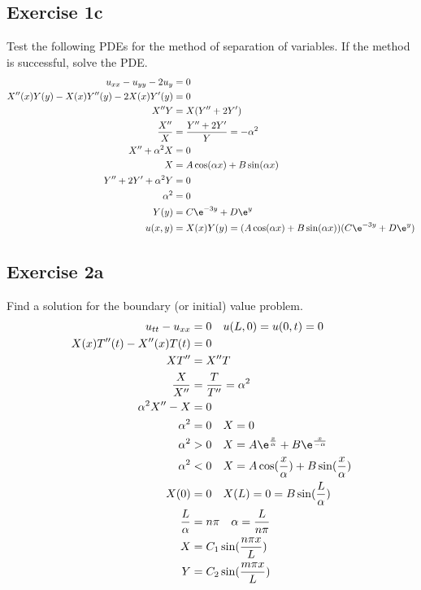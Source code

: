 \documentclass{math}
\begin{document}
\subsection*{Exercise 1c}
Test the following PDEs for the method of separation of variables. If the
method is successful, solve the PDE.
\begin{align*}
  u_{xx}-u_{yy}-2u_y &= 0 \\
  X''(x)Y(y)-X(x)Y''(y)-2X(x)Y'(y) &= 0 \\
  X''Y &= X(Y''+2Y') \\
  \frac{X''}{X} &= \frac{Y''+2Y'}{Y} = -\alpha^2 \\
  X''+\alpha^2X &= 0 \\
  X &= A\cos(\alpha x)+B\sin(\alpha x) \\
  Y''+2Y'+\alpha^2Y &= 0 \\
  \alpha^2 &= 0 \\
  Y(y) &= C\e^{-3y}+D\e^{y} \\
  u(x,y) &= X(x)Y(y) = (A\cos(\alpha x)+B\sin(\alpha x))(C\e^{-3y}+D\e^{y})
\end{align*}

\subsection*{Exercise 2a}
Find a solution for the boundary (or initial) value problem.
\begin{align*}
  u_{tt}-u_{xx} &= 0 \quad u(L,0) = u(0,t) = 0 \\
  X(x)T''(t)-X''(x)T(t) &= 0 \\
  XT'' &= X''T \\
  \frac{X}{X''} &= \frac{T}{T''} = \alpha^2 \\
  \alpha^2 X''-X &= 0 \\
  \alpha^2 &= 0 \quad X = 0 \\
  \alpha^2 &> 0 \quad X = A\e^{\frac{x}{\alpha}}+B\e^{\frac{x}{-\alpha}} \\
  \alpha^2 &< 0 \quad X = A\cos(\frac{x}{\alpha})+B\sin(\frac{x}{\alpha}) \\
  X(0) &= 0 \quad X(L) = 0 = B\sin(\frac{L}{\alpha}) \\
  \frac{L}{\alpha} &= n\pi \quad \alpha = \frac{L}{n\pi} \\
  X &= C_1\sin(\frac{n\pi x}{L}) \\
  Y &= C_2\sin(\frac{m\pi x}{L})
\end{align*}
\end{document}
